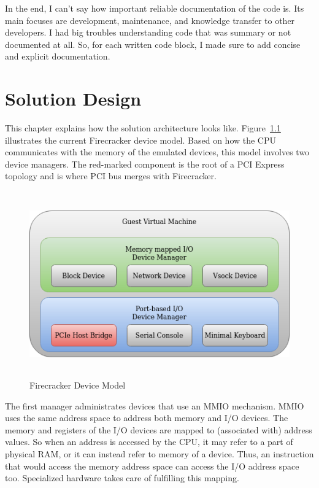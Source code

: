 \documentclass[12pt, a4paper]{report}
\begin{document}
In the end, I can't say how important reliable documentation of the code is. Its main focuses are development, maintenance, and knowledge transfer to other developers. I had big troubles understanding code that was summary or not documented at all. So, for each written code block, I made sure to add concise and explicit documentation.


\chapter{Solution Design}\label{Solution Design}

This chapter explains how the solution architecture looks like. Figure~\ref{fig:firecracker-device-model} illustrates the current Firecracker device model. Based on how the CPU communicates with the memory of the emulated devices, this model involves two device managers. The red-marked component is the root of a PCI Express topology and is where PCI bus merges with Firecracker.

\begin{figure}[H]
\centering
\includegraphics[height=8cm, keepaspectratio]{pics/firecracker-device-model.png}
  \caption{{Firecracker Device Model}}
  \label{fig:firecracker-device-model}
\end{figure}

The first manager administrates devices that use an MMIO mechanism. MMIO uses the same address space to address both memory and I/O devices. The memory and registers of the I/O devices are mapped to (associated with) address values. So when an address is accessed by the CPU, it may refer to a part of physical RAM, or it can instead refer to memory of a device. Thus, an instruction that would access the memory address space can access the I/O address space too. Specialized hardware takes care of fulfilling this mapping.
\end{document}
